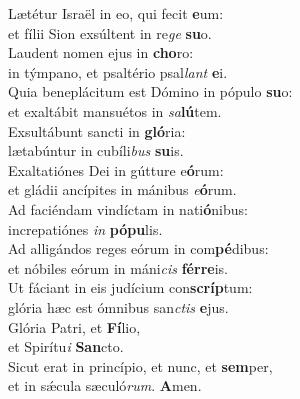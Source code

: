 \evenverse Lætétur Israël in eo, qui fecit \textbf{e}um:~\*\\
\evenverse et fílii Sion exsúltent in re\textit{ge} \textbf{su}o.\\
\oddverse Laudent nomen ejus in \textbf{cho}ro:~\*\\
\oddverse in týmpano, et psaltério psal\textit{lant} \textbf{e}i.\\
\evenverse Quia beneplácitum est Dómino in pópulo \textbf{su}o:~\*\\
\evenverse et exaltábit mansuétos in \textit{sa}\textbf{lú}tem.\\
\oddverse Exsultábunt sancti in \textbf{gló}ria:~\*\\
\oddverse lætabúntur in cubíli\textit{bus} \textbf{su}is.\\
\evenverse Exaltatiónes Dei in gútture e\textbf{ó}rum:~\*\\
\evenverse et gládii ancípites in mánibus \textit{e}\textbf{ó}rum.\\
\oddverse Ad faciéndam vindíctam in nati\textbf{ó}nibus:~\*\\
\oddverse increpatiónes \textit{in} \textbf{pó}\textbf{pu}lis.\\
\evenverse Ad alligándos reges eórum in com\textbf{pé}dibus:~\*\\
\evenverse et nóbiles eórum in máni\textit{cis} \textbf{fér}\textbf{re}is.\\
\oddverse Ut fáciant in eis judícium con\textbf{scríp}tum:~\*\\
\oddverse glória hæc est ómnibus san\textit{ctis} \textbf{e}jus.\\
\evenverse Glória Patri, et \textbf{Fí}lio,~\*\\
\evenverse et Spirítu\textit{i} \textbf{San}cto.\\
\oddverse Sicut erat in princípio, et nunc, et \textbf{sem}per,~\*\\
\oddverse et in sǽcula sæculó\textit{rum}. \textbf{A}men.\\
